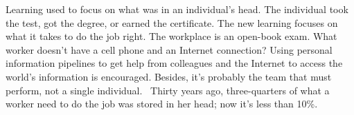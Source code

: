 Learning used to focus on what was in an individual's head. The
individual took the test, got the degree, or earned the certificate. The
new learning focuses on what it takes to do the job right. The workplace
is an open-book exam. What worker doesn't have a cell phone and an
Internet connection? Using personal information pipelines to get help
from colleagues and the Internet to access the world's information is
encouraged. Besides, it's probably the team that must perform, not a
single individual. ~Thirty years ago, three-quarters of what a worker
need to do the job was stored in her head; now it's less than 10\%. ~

